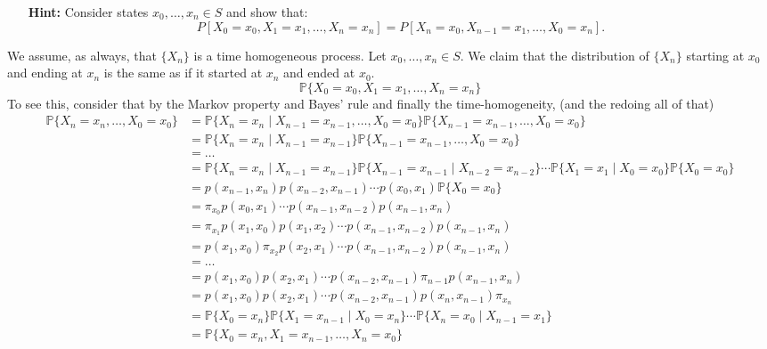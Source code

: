 \documentclass[11pt]{article}
\newcommand{\bbP}{\mathbb{P}}
\begin{document}
\begin{problem}
\begin{enumerate}
    \begin{itemize}
        \item[\textbf{Hint:}] Consider states \(x_0, \ldots, x_n \in S\) and show that:
        \[
        P[X_0 = x_0, X_1 = x_1, \ldots, X_n = x_n] = P[X_n = x_0, X_{n-1} = x_1, \ldots, X_0 = x_n].
        \]
    \end{itemize}
    \begin{solution}
    We assume, as always, that $\{X_n\}$ is a time homogeneous process. 
        Let $x_0, \dots, x_n \in S.$ We claim that the distribution of $\{X_n\}$ starting at $x_0$ and ending at $x_n$ is the same as if it started at $x_n$ and ended at $x_0.$ 
        \[\bbP\{X_0 = x_0, X_1 = x_1, \ldots, X_n = x_n\}\] To see this, consider that by the Markov property and Bayes' rule and finally the time-homogeneity, (and the redoing all of that)
        \begin{align*}
            \bbP\{X_n = x_n, \dots,X_0 = x_0\} &= \bbP\{X_n  = x_n \mid X_{n-1}  = x_{n-1}, \dots, X_0 = x_0\} \bbP\{X_{n-1}  = x_{n-1}, \dots, X_0 = x_0\}\\
            &= \bbP\{X_n = x_n \mid X_{n-1} = x_{n-1}\}\bbP\{X_{n-1}  = x_{n-1}, \dots, X_0 = x_0\}\\
            &= \dots\\
            &= \bbP\{X_n = x_n \mid X_{n-1} = x_{n-1}\}\bbP\{X_{n-1} = x_{n-1}\mid X_{n-2} = x_{n-2}\}\cdots \bbP\{X_1 = x_1 \mid X_0 = x_0\}\bbP\{X_0 = x_0\}\\
            &= p(x_{n-1}, x_n)p(x_{n-2}, x_{n-1})\cdots p(x_0, x_1)\bbP\{X_0 = x_0\}\\
            &= \pi_{x_0} p(x_0, x_1)\cdots p(x_{n-1}, x_{n-2})p(x_{n-1},x_n)\\
            &= \pi_{x_1}p(x_1, x_0) p(x_1, x_2)\cdots p(x_{n-1}, x_{n-2})p(x_{n-1},x_n)\\
            &= p(x_1, x_0)\pi_{x_2}p(x_2, x_1)\cdots p(x_{n-1}, x_{n-2})p(x_{n-1},x_n)\\
            &= \dots\\
            &= p(x_1, x_0)p(x_2, x_1)\cdots p(x_{n-2}, x_{n-1})\pi_{n-1}p(x_{n-1},x_n)\\
            &= p(x_1, x_0)p(x_2, x_1)\cdots p(x_{n-2}, x_{n-1})p(x_n, x_{n-1})\pi_{x_n}\\
            &= \bbP\{X_0 = x_n\}\bbP\{X_1 = x_{n-1} \mid X_0 = x_{n}\}\cdots \bbP\{X_n = x_0 \mid X_{n-1} = x_1\}\\
            &= \bbP\{X_0 = x_n, X_1 = x_{n-1}, \dots, X_n = x_0\}
        \end{align*}
    \end{solution}
\end{enumerate}
\end{problem}
\end{document}
